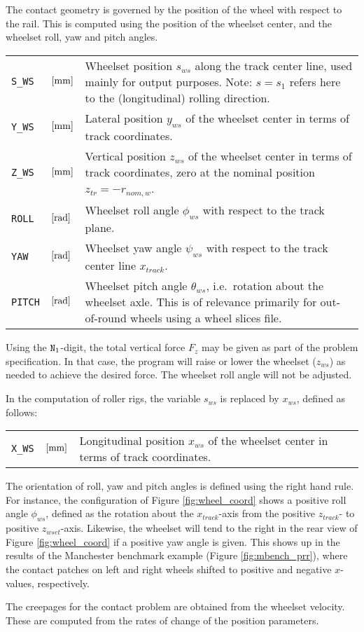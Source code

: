 \documentclass[12pt]{report}
\newenvironment{inputvars}{\vspace{0.4\baselineskip}%

\begin{tabular}{>{\raggedright}p{22mm}p{19mm}p{113mm}}}{
\end{tabular}

}
\newcommand{\inpvar}[3]{{\small\tt #1} & $#2$ & #3 \\[1ex]}
\newcommand{\inpbreak}{\end{inputvars}\begin{inputvars}}
\begin{document}
The contact geometry is governed by the position of the wheel with respect
to the rail. This is computed using the position of the wheelset center,
and the wheelset roll, yaw and pitch angles.
\begin{inputvars}
\inpvar{S\_WS}{\bunit{mm}}{Wheelset position $s_{ws}$ along the track center
        line, used mainly for output purposes. Note: $s=s_1$ refers here to
        the (longitudinal) rolling direction.}
\inpvar{Y\_WS}{\bunit{mm}}{Lateral position $y_{ws}$ of the wheelset center 
        in terms of track coordinates.}
\inpvar{Z\_WS}{\bunit{mm}}{Vertical position $z_{ws}$ of the wheelset center
        in terms of track coordinates, zero at the nominal position
        $z_{tr}=-r_{nom,w}$.}
\inpvar{ROLL}{\bunit{rad}}{Wheelset roll angle $\phi_{ws}$ with respect to the
        track plane.}
\inpvar{YAW}{\bunit{rad}}{Wheelset yaw angle $\psi_{ws}$ with respect to the
        track center line $x_{track}$.}
\inpvar{PITCH}{\bunit{rad}}{Wheelset pitch angle $\theta_{ws}$, i.e.\ rotation
        about the wheelset axle. This is of relevance primarily for
        out-of-round wheels using a wheel slices file.}
\end{inputvars}
Using the ${\tt N}_1$-digit, the total vertical force $F_z$ may be given as
part of the problem specification. In that case, the program will raise or
lower the wheelset ($z_{ws}$) as needed to achieve the desired force. The
wheelset roll angle will not be adjusted.

In the computation of roller rigs, the variable $s_{ws}$ is replaced by
$x_{ws}$, defined as follows:
\begin{inputvars}
\inpvar{X\_WS}{\bunit{mm}}{Longitudinal position $x_{ws}$ of the wheelset
        center in terms of track coordinates.}
\end{inputvars}
The orientation of roll, yaw and pitch angles is defined using the right
hand rule. For instance, the configuration of Figure \ref{fig:wheel_coord}
shows a positive roll angle $\phi_{ws}$, defined as the rotation about the
$x_{track}$-axis from the positive $z_{track}$- to positive $z_{wset}$-axis.
Likewise, the wheelset will tend to the right in the rear view of Figure
\ref{fig:wheel_coord} if a positive yaw angle is given. This shows up in
the results of the Manchester benchmark example (Figure
\ref{fig:mbench_prr}), where the contact patches on left and right wheels
shifted to positive and negative $x$-values, respectively.

The creepages for the contact problem are obtained from the wheelset
velocity. These are computed from the rates of change of the position
parameters.
\end{document}
